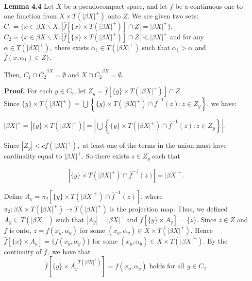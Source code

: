 \documentclass{article}
\begin{document}
\vskip 40pt




\textbf{Lemma 4.4} Let $X$ be a pseudocompact space, and let $f$ be a continuous one-to-one function from $X\times T(|\beta X|^+)$ onto $Z$. We are given two sets: \\
$C_1=\{x\in \beta X\backslash X: \left|\bar{f}[\{x\}\times T(|\beta X|^+)]\cap Z\right|=|\beta X|^+\}.$\\
$C_2=\{x\in \beta X\backslash X: \left|\bar{f}[\{x\}\times T(|\beta X|^+)]\cap Z\right|<|\beta X|^+ $ and for any $\alpha\in T(|\beta X|^+),$ there exists $\alpha_1\in T(|\beta X|^+)$ such that $\alpha_1 >\alpha$ and $\bar{f}(x,\alpha_1) \in Z \}.$

Then, $C_1\cap \overline{C_2}^{\beta X}=\emptyset$ and $X\cap \overline{C_2}^{\beta X}=\emptyset$.

\vskip 15pt

\textbf{Proof.} 
For each $y\in C_2$, let $Z_y=\bar{f}\left[\{y\}\times T(|\beta X|^+)\right] \cap Z$. \\
Since $\{y\}\times T(|\beta X|^+) = \bigcup \left\{ \{y\} \times T(|\beta X|^+) \cap \bar{f}^{-1}(z):z\in Z_y \right\}$, we have:
\begin{center}
$\left|\beta X\right|^+ =\left| \{y\}\times T(|\beta X|^+)\right| = \left| \bigcup \left\{ \{y\} \times T(|\beta X|^+) \cap \bar{f}^{-1}(z):z\in Z_y \right\}\right|.$
\end{center}
 Since $\left|Z_y\right|< cf(\left|\beta X\right|^+),$ at least one of the terms in the union must have cardinality equal to $\left|\beta X\right|^+$. So there exists $z\in Z_y$ such that 
 
 $$\left|  \{y\} \times T(|\beta X|^+) \cap \bar{f}^{-1}(z) \right|=\left|\beta X\right|^+.$$ 
 
\vskip 15pt
 
Define $A_y=\pi_2 \left[ \{y\} \times T(|\beta X|^+) \cap \bar{f}^{-1}(z) \right]$, where $\pi_2: \beta X \times 
T(|\beta X|^+) \rightarrow T(|\beta X|^+)$ is the projection map. Thus, we defined $A_y\subseteq T(\left|\beta X\right|^+)$ such that $\left|A_y\right|=\left|\beta X\right|^+$ and $\bar{f}[\{y\}\times A_y]=\{z\}.$ Since $z\in Z$ and $f$ is onto, $z=f(x_y,\alpha_y)$ for some $(x_y,\alpha_y)\in X\times T(|\beta X|^+).$ Hence $\bar{f}\left[\{x\}\times A_y\right]=\{f(x_y,\alpha_y)\}$ for some $(x_y, \alpha_y)\in X\times T(|\beta X|^+).$ By the continuity of $\bar{f},$ we have that $$\bar{f}\left[\{y\}\times \overline{A_y}^{T(|\beta X|^+)}\right]=f(x_y,\alpha_y) \mbox{ holds for all } y \in C_2.$$
\end{document}
